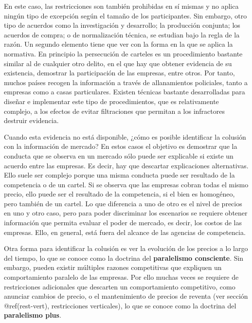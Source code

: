 \documentclass[
  12pt,
  spanish,
]{book}
\begin{document}
En este caso, las restricciones son también prohibidas en sí mismas y no
aplica ningún tipo de excepción según el tamaño de los participantes.
Sin embargo, otro tipo de acuerdos como la investigación y desarrollo;
la producción conjunta; los acuerdos de compra; o de normalización
técnica, se estudian bajo la regla de la razón. Un segundo elemento
tiene que ver con la forma en la que se aplica la normativa. En
principio la persecución de carteles es un procedimiento bastante
similar al de cualquier otro delito, en el que hay que obtener evidencia
de su existencia, demostrar la participación de las empresas, entre
otros. Por tanto, muchos países recogen la información a través de
allanamientos policiales, tanto a empresas como a casas particulares.
Existen técnicas bastante desarrolladas para diseñar e implementar este
tipo de procedimientos, que es relativamente complejo, a los efectos de
evitar filtraciones que permitan a los infractores destruir evidencia.

Cuando esta evidencia no está disponible, ¿cómo es posible identificar
la colusión con la información de mercado? En estos casos el objetivo es
demostrar que la conducta que se observa en un mercado sólo puede ser
explicable si existe un acuerdo entre las empresas. Es decir, hay que
descartar explicaciones alternativas. Ello suele ser complejo porque una
misma conducta puede ser resultado de la competencia o de un cartel. Si
se observa que las empresas cobran todas el mismo precio, ello puede ser
el resultado de la competencia, si el bien es homogéneo, pero también de
un cartel. Lo que diferencia a uno de otro es el nivel de precios en uno
y otro caso, pero para poder discriminar los escenarios se requiere
obtener información que permita evaluar el poder de mercado, es decir,
los costos de las empresas. Ello, en general, está fuera del alcance de
las agencias de competencia.

Otra forma para identificar la colusión es ver la evolución de los
precios a lo largo del tiempo, lo que se conoce como la doctrina del
\textbf{paralelismo consciente}. Sin embargo, pueden existir múltiples
razones competitivas que expliquen un comportamiento paralelo de las
empresas. Por ello muchas veces se requiere de restricciones adicionales
que descarten un comportamiento competitivo, como anunciar cambios de
precio, o el mantenimiento de precios de reventa (ver sección
@ref(rest-vert), restricciones verticales), lo que se conoce como la
doctrina del \textbf{paralelismo plus}.
\end{document}
